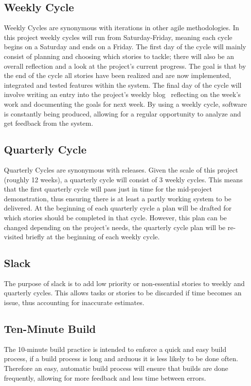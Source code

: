 \documentclass[11pt,fleqn,twoside]{article}
\begin{document}
\subsection{Weekly Cycle}
Weekly Cycles are synonymous with iterations in other agile methodologies. In this project weekly cycles will run from Saturday-Friday, meaning each cycle begins on a Saturday and ends on a Friday. The first day of the cycle will mainly consist of planning and choosing which stories to tackle; there will also be an overall reflection and a look at the project's current progress. The goal is that by the end of the cycle all stories have been realized and are now implemented, integrated and tested features within the system. The final day of the cycle will involve writing an entry into the project's weekly blog~\cite{blog_ref} reflecting on the week's work and documenting the goals for next week. By using a weekly cycle, software is constantly being produced, allowing for a regular opportunity to analyze and get feedback from the system.

\subsection{Quarterly Cycle}
Quarterly Cycles are synonymous with releases. Given the scale of this project (roughly 12 weeks), a quarterly cycle will consist of 3 weekly cycles. This means that the first quarterly cycle will pass just in time for the mid-project demonstration, thus ensuring there is at least a partly working system to be delivered. At the beginning of each quarterly cycle a plan will be drafted for which stories should be completed in that cycle. However, this plan can be changed depending on the project's needs, the quarterly cycle plan will be re-visited briefly at the beginning of each weekly cycle. 

\subsection{Slack}
The purpose of slack is to add low priority or non-essential stories to weekly and quarterly cycles. This allows tasks or stories to be discarded if time becomes an issue, thus accounting for inaccurate estimates.

\subsection{Ten-Minute Build}
The 10-minute build practice is intended to enforce a quick and easy build process, if a build process is long and arduous it is less likely to be done often. Therefore an easy, automatic build process will ensure that builds are done frequently, allowing for more feedback and less time between errors.
\end{document}
